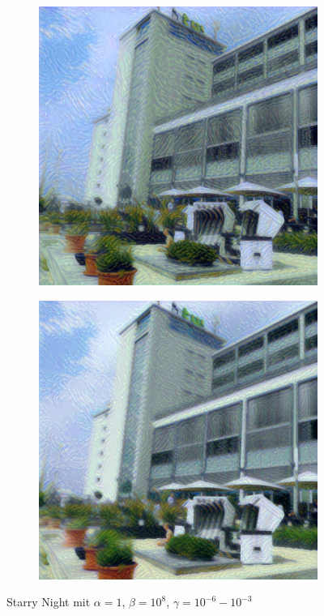 \begin{figure}[H]
\begin{subfigure}[h]{0.24\textwidth}
    \end{subfigure}
    \begin{subfigure}[h]{0.24\textwidth}
        \centering
        \includegraphics[width=\textwidth]{resources/content/experiments/b__starry_night__768x768__style-weight_1e+08__tv-weight_1e-04.jpg}
    \end{subfigure}
    \begin{subfigure}[h]{0.24\textwidth}
        \centering
        \includegraphics[width=\textwidth]{resources/content/experiments/b__starry_night__768x768__style-weight_1e+08__tv-weight_1e-03.jpg}
    \end{subfigure}
    \caption{Starry Night mit $ \alpha = 1 $, $ \beta = 10^{8} $, $ \gamma = 10^{-6} - 10^{-3} $}
\end{figure}

